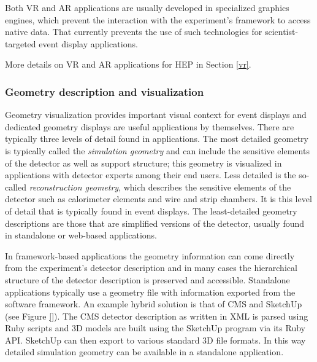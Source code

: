 \documentclass[12pt,a4paper]{article}
\begin{document}
Both VR and AR applications are usually developed in specialized graphics engines, which prevent the interaction with the experiment's framework to access native data. That currently prevents the use of such technologies for scientist-targeted event display applications.

More details on VR and AR applications for HEP in Section \ref{vr}.



\hypertarget{geometry-description}{%
\subsubsection{Geometry description and visualization}\label{geometry-description}}

Geometry visualization provides important visual context for event displays and dedicated geometry displays are useful applications by themselves.
There are typically three levels of detail found in applications. The most detailed geometry is typically called the \textit{simulation geometry}
and can include the sensitive elements of the detector as well as support structure; this geometry is visualized in applications with detector experts among their end users. Less detailed is the so-called \textit{reconstruction geometry}, which describes the sensitive elements of the detector such as calorimeter elements and wire and strip chambers. It is this level of
detail that is typically found in event displays. The least-detailed geometry descriptions are those that are simplified versions of the
detector, usually found in standalone or web-based applications.





In framework-based applications the geometry information can come directly from the experiment's detector description and in
 many cases the hierarchical structure of the detector description is preserved and accessible. Standalone applications
typically use a geometry file with information exported from the software framework. An example hybrid solution is that of CMS and SketchUp~\cite{CMSSketchUp} (see Figure \ref{}).
The CMS detector description as written in XML is parsed using Ruby scripts and 3D models are built using the SketchUp program via its
Ruby API. SketchUp can then export to various standard 3D file formats. In this way detailed simulation geometry can be available in a standalone
application.
\end{document}
